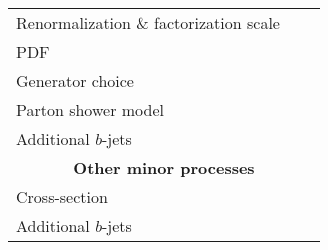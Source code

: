 \documentclass[../thesis.tex]{subfiles}
\begin{document}
\begin{table}[!ht]
\begin{center}
{\begin{tabular}{lcc}
      Renormalization \& factorization scale & & \\
      PDF & & \\
      Generator choice & & \\
      Parton shower model & & \\
      Additional $b$-jets & & \\
      \midrule
      \multicolumn{3}{c}{\textbf{Other minor processes}}  \\
      \midrule
      Cross-section & & \\
      Additional $b$-jets & & \\
      \bottomrule
    \end{tabular}}
  \end{center}
  \caption{} 
  \label{tab:syst_bg}
\end{table}
\end{document}
